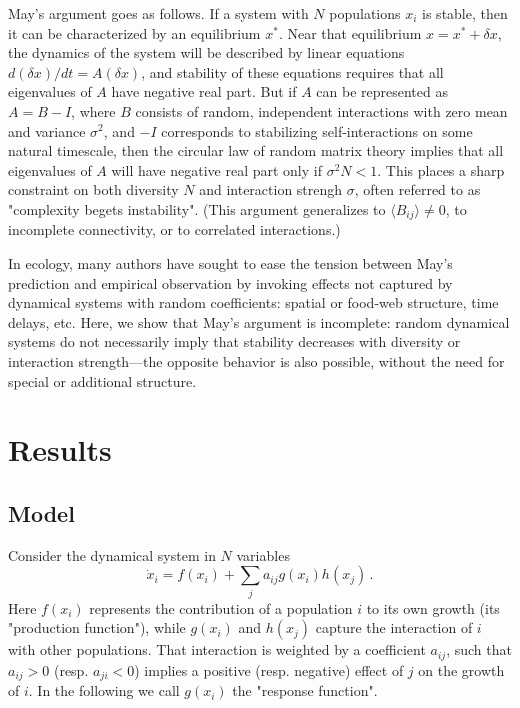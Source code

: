 \documentclass[%
 reprint,
 amsmath,amssymb,
 aps,
]{revtex4-2}
\begin{document}
May's argument goes as follows. If a system with $N$ populations $x_i$ is stable, then it can be characterized by an equilibrium $x^*$. Near that equilibrium $x = x^* + \delta x$, the dynamics of the system will be described by linear equations $d(\delta x)/dt = A (\delta x)$, and stability of these equations requires that all eigenvalues of $A$ have negative real part. But if $A$ can be represented as $A = B - I$, where $B$ consists of random, independent interactions with zero mean and variance $\sigma^2$, and $-I$ corresponds to stabilizing self-interactions on some natural timescale, then the circular law of random matrix theory implies that all eigenvalues of $A$ will have negative real part only if $\sigma^2 N < 1$. This places a sharp constraint on both diversity $N$ and interaction strengh $\sigma$, often referred to as "complexity begets instability". (This argument generalizes to $\langle B_{ij}\rangle \neq 0$, to incomplete connectivity, or to correlated interactions.)
 
In ecology, many authors have sought to ease the tension between May's prediction and empirical observation by invoking effects not captured by dynamical systems with random coefficients: spatial or food-web structure, time delays, etc. Here, we show that May's argument is incomplete: random dynamical systems do not necessarily imply that stability decreases with diversity or interaction strength---the opposite behavior is also possible, without the need for special or additional structure. 

\section{Results}

\subsection{Model}

Consider the dynamical system in $N$ variables
\begin{equation}\label{dynamics}
    \dot{x}_i = f(x_i) + \sum_{j}a_{ij}g(x_i)h(x_j) \, .
\end{equation}
Here $f(x_i)$ represents the contribution of a population $i$ to its own growth (its "production function"), while $g(x_i)$ and $h(x_j)$ capture the interaction of $i$ with other populations. That interaction is weighted by a coefficient $a_{ij}$, such that $a_{ij} > 0$ (resp. $a_{ji} < 0$) implies a positive (resp. negative) effect of $j$ on the growth of $i$. In the following we call $g(x_i)$ the "response function". 
\end{document}
